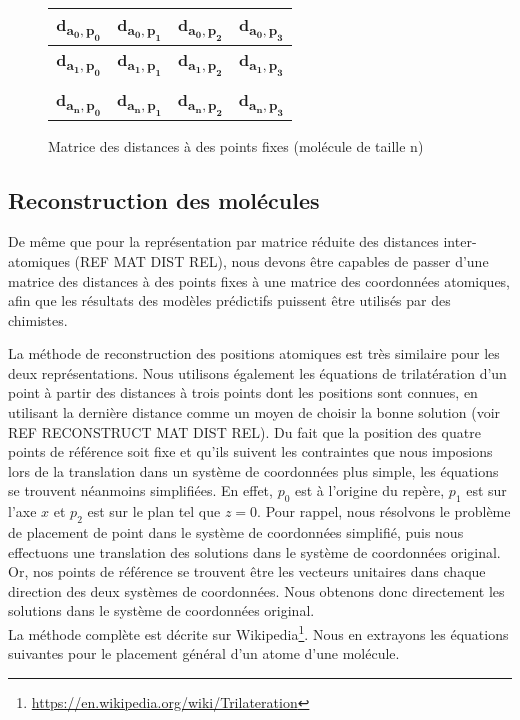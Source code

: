\begin{figure}[h!]
	\centering
	
	\begin{tabular}{|c|c|c|c|}
		\hline
		\textbf{d\textsubscript{$\mathbf{a_0,p_0}$}} & \textbf{d\textsubscript{$\mathbf{a_0,p_1}$}} & \textbf{d\textsubscript{$\mathbf{a_0,p_2}$}} & \textbf{d\textsubscript{$\mathbf{a_0,p_3}$}} \\ \hline
		\textbf{d\textsubscript{$\mathbf{a_1,p_0}$}} & \textbf{d\textsubscript{$\mathbf{a_1,p_1}$}} & \textbf{d\textsubscript{$\mathbf{a_1,p_2}$}} & \textbf{d\textsubscript{$\mathbf{a_1,p_3}$}} \\ \hline
		\rot{... } & \rot{... } & \rot{... } & \rot{... } \\ \hline
		\textbf{d\textsubscript{$\mathbf{a_n,p_0}$}} & \textbf{d\textsubscript{$\mathbf{a_n,p_1}$}} & \textbf{d\textsubscript{$\mathbf{a_n,p_2}$}} & \textbf{d\textsubscript{$\mathbf{a_n,p_3}$}} \\ \hline
	\end{tabular}
	
	\caption{Matrice des distances à des points fixes (molécule de taille n)}
\end{figure}


\subsection{Reconstruction des molécules}
\par De même que pour la représentation par matrice réduite des distances inter-atomiques (REF MAT DIST REL), nous devons être capables de passer d'une matrice des distances à des points fixes à une matrice des coordonnées atomiques, afin que les résultats des modèles prédictifs puissent être utilisés par des chimistes.\\

\par La méthode de reconstruction des positions atomiques est très similaire pour les deux représentations. Nous utilisons également les équations de trilatération d'un point à partir des distances à trois points dont les positions sont connues, en utilisant la dernière distance comme un moyen de choisir la bonne solution (voir REF RECONSTRUCT MAT DIST REL). Du fait que la position des quatre points de référence soit fixe et qu'ils suivent les contraintes que nous imposions lors de la translation dans un système de coordonnées plus simple, les équations se trouvent néanmoins simplifiées. En effet, $p_0$ est à l'origine du repère, $p_1$ est sur l'axe $x$ et $p_2$ est sur le plan tel que $z=0$. Pour rappel, nous résolvons le problème de placement de point dans le système de coordonnées simplifié, puis nous effectuons une translation des solutions dans le système de coordonnées original. Or, nos points de référence se trouvent être les vecteurs unitaires dans chaque direction des deux systèmes de coordonnées. Nous obtenons donc directement les solutions dans le système de coordonnées original. \\
La méthode complète est décrite sur Wikipedia\footnote{\url{https://en.wikipedia.org/wiki/Trilateration}}. Nous en extrayons les équations suivantes pour le placement général d'un atome d'une molécule.

